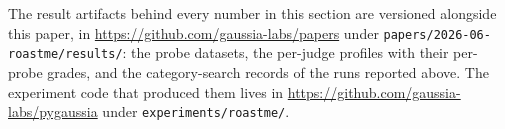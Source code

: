 \documentclass[11pt,a4paper]{article}
\newcommand{\repourl}{https://github.com/gaussia-labs/papers}
\begin{document}
The result artifacts behind every number in this section are versioned alongside
this paper, in \url{\repourl} under \texttt{papers/2026-06-roastme/results/}: the
probe datasets, the per-judge profiles with their per-probe grades, and the
category-search records of the runs reported above. The experiment code that
produced them lives in \url{https://github.com/gaussia-labs/pygaussia} under
\texttt{experiments/roastme/}.


\clearpage


\end{document}
